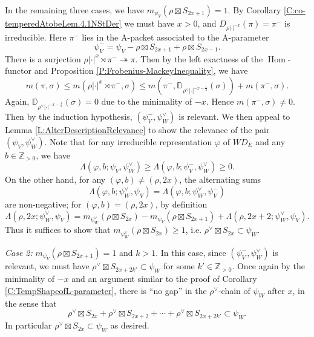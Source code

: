 \documentclass[11pt,letterpaper]{amsart}
\theoremstyle{plain}
\numberwithin{theorem}{section}
\numberwithin{equation}{subsection}
\theoremstyle{remark}
\newcommand{\Hom}{\operatorname{Hom}}
\newcommand{\D}{\mathbb{D}}
\newcommand{\Z}{\mathbb{Z}}
\begin{document}
In the remaining three cases, we have $m_{\psi_V}\left(\rho \boxtimes S_{2x+1}\right)=1$. By Corollary \ref{C:co-temperedAtobeLem.4.1NStDer} we must have $x>0$, and $D_{\rho|\cdot|^{-x}}\left(\pi\right) = \pi^-$ is irreducible. Here $\pi^-$ lies in the A-packet associated to the A-parameter
\[
    \psi_V^- = \psi_V -\rho\boxtimes S_{2x+1} + \rho \boxtimes S_{2x-1}.
\]
There is a surjection $\rho|\cdot|^x\rtimes \pi^- \twoheadrightarrow \pi$. Then by the left exactness of the \(\Hom\)-functor and Proposition \ref{P:Frobenius-MackeyInequality}, we have
\[
    m\left(\pi,\sigma\right)\leq m\left(\rho|\cdot|^x\rtimes \pi^-,\sigma\right) \leq m\left(\pi^-,\D_{\rho^\vee|\cdot|^{-x-\frac{1}{2}}}\left(\sigma\right)\right) + m\left(\pi^-,\sigma\right).
\]
Again, $\D_{\rho^\vee|\cdot|^{-x-\frac{1}{2}}}\left(\sigma\right)=0$ due to the minimality of $-x$. Hence $m\left(\pi^-,\sigma\right)\neq 0$. Then by the induction hypothesis, $\left(\psi_V^-,\psi_W^\vee\right)$ is relevant. We then appeal to Lemma \ref{L:AlterDescriptionRelevance} to show the relevance of the pair $\left(\psi_V,\psi_W^\vee\right)$. Note that for any irreducible representation $\varphi$ of $WD_E$ and any $b\in\Z_{>0}$, we have
\[
    \Lambda\left(\varphi,b;\psi_V,\psi_W^\vee\right) \geq \Lambda\left(\varphi,b;\psi_V^-,\psi_W^\vee\right) \geq 0.
\]
On the other hand, for any $\left(\varphi,b\right)\neq\left(\rho, 2x\right)$, the alternating sums
\[
    \Lambda\left(\varphi,b;\psi_W^\vee,\psi_V\right) = \Lambda\left(\varphi,b;\psi_W^\vee,\psi_V^-\right)
\]
are non-negative; for $\left(\varphi,b\right) = \left(\rho, 2x\right)$, by definition
\[
    \Lambda\left(\rho, 2x;\psi_W^\vee,\psi_V\right) = m_{\psi_W^\vee}\left(\rho\boxtimes S_{2x}\right) - m_{\psi_V}\left(\rho\boxtimes S_{2x+1}\right) + \Lambda\left(\rho, 2x+2;\psi_W^\vee,\psi_V\right).
\]
Thus it suffices to show that $m_{\psi_W^\vee}\left(\rho\boxtimes S_{2x}\right)\geq 1$, i.e. $\rho^\vee\boxtimes S_{2x}\subset \psi_W$.

\vskip 5pt

\emph{Case 2:} $m_{\psi_V}\left(\rho\boxtimes S_{2x+1}\right)=1$ and $k>1$. In this case, since $\left(\psi_V^-,\psi_W^\vee\right)$ is relevant, we must have $\rho^\vee\boxtimes S_{2x+2k'} \subset \psi_W$ for some $k'\in\Z_{> 0}$. Once again by the minimality of $-x$ and an argument similar to the proof of Corollary \ref{C:TempShapeofL-parameter}, there is ``no gap'' in the $\rho^\vee$-chain of $\psi_W$ after $x$, in the sense that
\[
    \rho^\vee\boxtimes S_{2x} + \rho^\vee\boxtimes S_{2x+2} + \cdots + \rho^\vee\boxtimes S_{2x+2k'} \subset \psi_W.
\]
In particular $\rho^\vee\boxtimes S_{2x}\subset \psi_W$ as desired.
\end{document}

